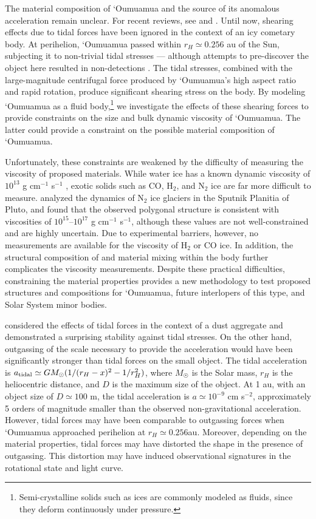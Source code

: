 \documentclass[twocolumn,doublespacing]{aastex631}
\begin{document}
The material composition of `Oumuamua and the source of its anomalous acceleration remain unclear. For recent reviews, see \citet{Jewitt2022ARAA} and \citet{MoroMartin2022}. Until now, shearing effects due to tidal forces have been ignored in the context of an icy cometary body. At perihelion, `Oumuamua passed within $r_H\simeq0.256$ au of the Sun, subjecting it to non-trivial tidal stresses --- although attempts to pre-discover the object here resulted in non-detections \citep{hui2019}. The tidal stresses, combined with the large-magnitude centrifugal force produced by `Oumuamua's high aspect ratio and rapid rotation, produce significant shearing stress on the body. By modeling `Oumuamua as a fluid body,\footnote{Semi-crystalline solids such as ices are commonly modeled as fluids, since they deform continuously under pressure.} we investigate the effects of these shearing forces to provide constraints on the size and bulk dynamic viscosity of `Oumuamua. The latter could provide a constraint on the possible material composition of `Oumuamua.

Unfortunately, these constraints are weakened by the difficulty of measuring the viscosity of proposed materials. While water ice has a known dynamic viscosity of $10^{13}$ g cm$^{-1}$ s$^{-1}$ \citep{fowler1997}, exotic solids such as CO, H$_2$, and N$_2$ ice are far more difficult to measure. \citet{vilelladeschamps2017} analyzed the dynamics of N$_2$ ice glaciers in the Sputnik Planitia of Pluto, and found that the observed polygonal structure is consistent with viscosities of $10^{15}$--$10^{17}$ g cm$^{-1}$ s$^{-1}$, although these values are not well-constrained and are highly uncertain. Due to experimental barriers, however, no measurements are available for the viscosity of H$_2$ or CO ice. In addition, the structural composition of and material mixing within the body further complicates the viscosity measurements. Despite these practical difficulties, constraining the material properties provides a new methodology to test proposed structures and compositions for `Oumuamua, future interlopers of this type, and Solar System minor bodies. 

\citet{flekkoy2019} considered the effects of tidal forces in the context of a dust aggregate and demonstrated a surprising stability against tidal stresses. On the other hand, outgassing of the scale necessary to provide the acceleration would have been significantly stronger than tidal forces on the small object. The tidal acceleration is $a_{\rm tidal}\simeq GM_\odot (1/(r_H-x)^2-1/r_H^2)$, where $M_\Sun$ is the Solar mass, $r_H$ is the heliocentric distance, and $D$ is the maximum size of the object. At 1 au, with an object size of $D\simeq100$ m, the tidal acceleration is $a\simeq10^{-9}$ cm s$^{-2}$, approximately 5 orders of magnitude smaller than the observed non-gravitational acceleration. However, tidal forces may have been comparable to outgassing forces when `Oumuamua approached perihelion at $r_H\simeq0.256$au. Moreover, depending on the material properties, tidal forces may have distorted the shape in the presence of outgassing. This distortion may have induced observational signatures in the rotational state and light curve.
\end{document}
